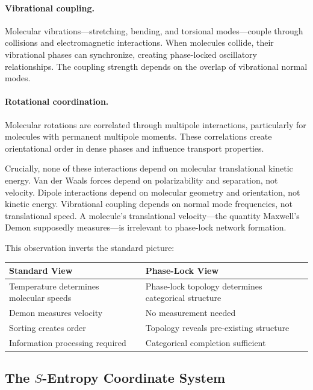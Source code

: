 \documentclass[twocolumn,showpacs,preprintnumbers,amsmath,amssymb,prd]{revtex4-2}
\theoremstyle{definition}
\theoremstyle{remark}
\begin{document}
\paragraph{Vibrational coupling.} Molecular vibrations---stretching, bending, and torsional modes---couple through collisions and electromagnetic interactions. When molecules collide, their vibrational phases can synchronize, creating phase-locked oscillatory relationships. The coupling strength depends on the overlap of vibrational normal modes.

\paragraph{Rotational coordination.} Molecular rotations are correlated through multipole interactions, particularly for molecules with permanent multipole moments. These correlations create orientational order in dense phases and influence transport properties.

Crucially, none of these interactions depend on molecular translational kinetic energy. Van der Waals forces depend on polarizability and separation, not velocity. Dipole interactions depend on molecular geometry and orientation, not kinetic energy. Vibrational coupling depends on normal mode frequencies, not translational speed. A molecule's translational velocity---the quantity Maxwell's Demon supposedly measures---is irrelevant to phase-lock network formation.

This observation inverts the standard picture:

\begin{center}
\begin{tabular}{p{3.5cm}|p{3.5cm}}
\textbf{Standard View} & \textbf{Phase-Lock View} \\
\hline
Temperature determines molecular speeds & Phase-lock topology determines categorical structure \\
Demon measures velocity & No measurement needed \\
Sorting creates order & Topology reveals pre-existing structure \\
Information processing required & Categorical completion sufficient
\end{tabular}
\end{center}

\subsection{The $S$-Entropy Coordinate System}
\end{document}
